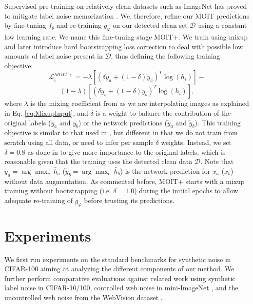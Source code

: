 \documentclass[final]{cvpr}
\begin{document}
Supervised pre-training on relatively clean datasets such as ImageNet \cite{2009_CVPR_ImageNet} has proved to mitigate label noise memorization \cite{2019_ICML_PreTraining,2020_ICML_DatasetOOD}. We, therefore, refine our MOIT predictions by fine-tuning $f_{\theta}$ and re-training $g_{\varphi}$ on our detected clean set $\mathcal{D}$ using a constant low learning rate. We name this fine-tuning stage MOIT+. We train using mixup \cite{2018_ICLR_mixup} and later introduce  hard bootstrapping loss correction \cite{2015_ICLR_Bootstrapping} to deal with possible low amounts of label noise present in $\mathcal{D}$, thus defining the following training objective: 
\begin{equation*}
\mathcal{L}_{i}^{\mathit{MOIT+}}=-\lambda\left[\left(\delta y_{a}+\left(1-\delta\right)\tilde{y}_{a}\right)^{T}\log\left(\mathit{h_{i}}\right)\right]-
\end{equation*}
\begin{equation}
\left(1-\lambda\right)\left[\left(\delta y_{b}+\left(1-\delta\right)\tilde{y}_{b}\right)^{T}\log\left(\mathit{h_{i}}\right)\right],\label{eq:LossMOIT+}
\end{equation}
where $\lambda$ is the mixing coefficient from \cite{2018_ICLR_mixup} as we are interpolating images as explained in Eq. \ref{eq:MixupInput}, and $\delta$ is a weight to balance the contribution of the original labels ($y_{a}$ and $y_{b}$) or the network predictions ($\tilde{y}_{a}$ and $\tilde{y}_{b}$). This training objective is similar to that used in \cite{2019_ICML_DynamicBootstrapping}, but different in that we do not train from scratch using all data, or need to infer per sample $\delta$ weights. Instead, we set $\delta=0.8$ as done in \cite{2015_ICLR_Bootstrapping} to give more importance to the original labels, which is reasonable given that the training uses the detected clean data $\mathcal{D}$. Note that $\tilde{y}_{a}=\arg\max_{c}\:\bar{h}_{a}$ ($\tilde{y}_{b}=\arg\max_{c}\:\bar{h}_{b}$) is the network prediction for $x_{a}$ ($x_{b}$) without data augmentation. As commented before, MOIT+ starts with a mixup training without bootstrapping (i.e. $\delta=1.0$) during the initial epochs to allow adequate re-training of $g_{\varphi}$ before trusting its predictions.


\section{Experiments}

We first run experiments on the standard benchmarks for synthetic noise in CIFAR-100 \cite{2009_CIFAR} aiming at analyzing the different components of our method. We further perform comparative evaluations against related work using synthetic label noise in CIFAR-10/100, controlled web noise in mini-ImageNet \cite{2020_ICML_DatasetOOD}, and the uncontrolled web noise from the WebVision dataset \cite{2017_arXiv_WebVision}. 
\end{document}
